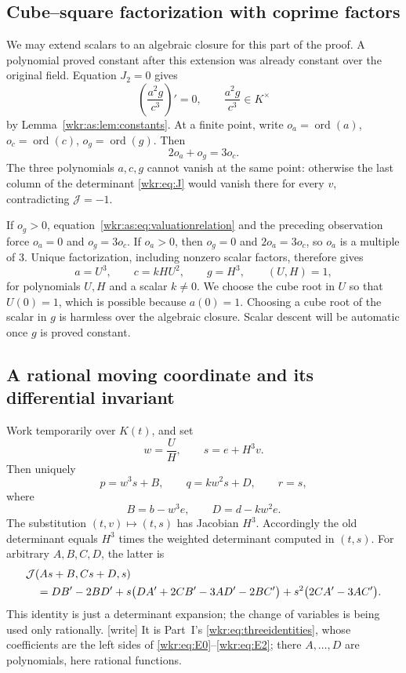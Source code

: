 \documentclass[11pt,a4paper]{article}
\numberwithin{equation}{section}
\theoremstyle{definition}
\theoremstyle{remark}
\newcommand{\J}{\mathcal{J}}
\newcommand{\ord}{\operatorname{ord}}
\begin{document}
\subsection{Cube--square factorization with coprime factors}

We may extend scalars to an algebraic closure for this part of the proof.
A polynomial proved constant after this extension was already constant
over the original field. Equation $J_2=0$ gives
\[
\left(\frac{a^2g}{c^3}\right)'=0,
\qquad \frac{a^2g}{c^3}\in K^\times
\]
by Lemma~\ref{wkr:as:lem:constants}. At a finite point, write
$o_a=\ord(a)$, $o_c=\ord(c)$, $o_g=\ord(g)$. Then
\begin{equation}\label{wkr:as:eq:valuationrelation}
2o_a+o_g=3o_c.
\end{equation}
The three polynomials $a,c,g$ cannot vanish at the same point: otherwise
the last column of the determinant \eqref{wkr:eq:J} would vanish there
for every $v$, contradicting $\J=-1$.

If $o_g>0$, equation~\eqref{wkr:as:eq:valuationrelation} and the
preceding observation force $o_a=0$ and $o_g=3o_c$. If $o_a>0$, then
$o_g=0$ and $2o_a=3o_c$, so $o_a$ is a multiple of $3$. Unique
factorization, including nonzero scalar factors, therefore gives
\begin{equation}\label{wkr:as:eq:UHfactor}
a=U^3,\qquad c=kHU^2,\qquad g=H^3,
\qquad (U,H)=1,
\end{equation}
for polynomials $U,H$ and a scalar $k\ne0$. We choose the cube root in $U$
so that $U(0)=1$, which is possible because $a(0)=1$. Choosing a cube
root of the scalar in $g$ is harmless over the algebraic closure. Scalar
descent will be automatic once $g$ is proved constant.

\subsection{A rational moving coordinate and its differential invariant}

Work temporarily over $K(t)$, and set
\[
w=\frac UH,\qquad s=e+H^3v.
\]
Then uniquely
\begin{equation}\label{wkr:as:eq:moving}
p=w^3s+B,\qquad q=kw^2s+D,\qquad r=s,
\end{equation}
where
\[
B=b-w^3e,\qquad D=d-kw^2e.
\]
The substitution $(t,v)\mapsto(t,s)$ has Jacobian $H^3$. Accordingly the
old determinant equals $H^3$ times the weighted determinant computed in
$(t,s)$. For arbitrary $A,B,C,D$, the latter is
\begin{align}
&\J(As+B,Cs+D,s)\notag\\
&\quad=DB'-2BD'
+s\bigl(DA'+2CB'-3AD'-2BC'\bigr)
+s^2\bigl(2CA'-3AC'\bigr).\label{wkr:as:eq:movingcoeff}
\end{align}
This identity is just a determinant expansion; the change of variables is
being used only rationally. \textup{[write]} It is Part~I's
\eqref{wkr:eq:threeidentities}, whose coefficients are the left sides of
\eqref{wkr:eq:E0}--\eqref{wkr:eq:E2}; there $A,\ldots,D$ are
polynomials, here rational functions.
\end{document}
